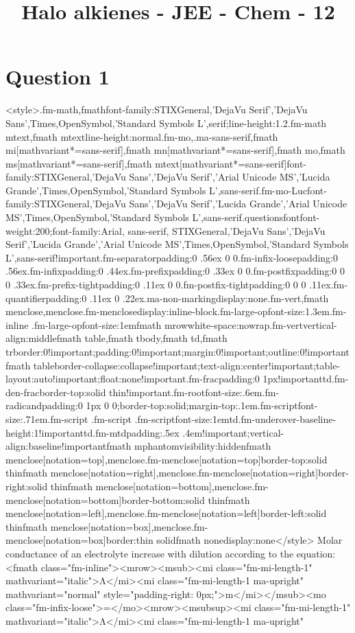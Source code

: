 \documentclass{article}
\title{Halo alkienes - JEE - Chem - 12 }
\begin{document}
                    \maketitle
                    \section*{Question 1}
<style>.fm-math,fmath{font-family:STIXGeneral,'DejaVu Serif','DejaVu Sans',Times,OpenSymbol,'Standard Symbols L',serif;line-height:1.2}.fm-math mtext,fmath mtext{line-height:normal}.fm-mo,.ma-sans-serif,fmath mi[mathvariant*=sans-serif],fmath mn[mathvariant*=sans-serif],fmath mo,fmath ms[mathvariant*=sans-serif],fmath mtext[mathvariant*=sans-serif]{font-family:STIXGeneral,'DejaVu Sans','DejaVu Serif','Arial Unicode MS','Lucida Grande',Times,OpenSymbol,'Standard Symbols L',sans-serif}.fm-mo-Luc{font-family:STIXGeneral,'DejaVu Sans','DejaVu Serif','Lucida Grande','Arial Unicode MS',Times,OpenSymbol,'Standard Symbols L',sans-serif}.questionsfont{font-weight:200;font-family:Arial, sans-serif, STIXGeneral,'DejaVu Sans','DejaVu Serif','Lucida Grande','Arial Unicode MS',Times,OpenSymbol,'Standard Symbols L',sans-serif!important}.fm-separator{padding:0 .56ex 0 0}.fm-infix-loose{padding:0 .56ex}.fm-infix{padding:0 .44ex}.fm-prefix{padding:0 .33ex 0 0}.fm-postfix{padding:0 0 0 .33ex}.fm-prefix-tight{padding:0 .11ex 0 0}.fm-postfix-tight{padding:0 0 0 .11ex}.fm-quantifier{padding:0 .11ex 0 .22ex}.ma-non-marking{display:none}.fm-vert,fmath menclose,menclose.fm-menclose{display:inline-block}.fm-large-op{font-size:1.3em}.fm-inline .fm-large-op{font-size:1em}fmath mrow{white-space:nowrap}.fm-vert{vertical-align:middle}fmath table,fmath tbody,fmath td,fmath tr{border:0!important;padding:0!important;margin:0!important;outline:0!important}fmath table{border-collapse:collapse!important;text-align:center!important;table-layout:auto!important;float:none!important}.fm-frac{padding:0 1px!important}td.fm-den-frac{border-top:solid thin!important}.fm-root{font-size:.6em}.fm-radicand{padding:0 1px 0 0;border-top:solid;margin-top:.1em}.fm-script{font-size:.71em}.fm-script .fm-script .fm-script{font-size:1em}td.fm-underover-base{line-height:1!important}td.fm-mtd{padding:.5ex .4em!important;vertical-align:baseline!important}fmath mphantom{visibility:hidden}fmath menclose[notation=top],menclose.fm-menclose[notation=top]{border-top:solid thin}fmath menclose[notation=right],menclose.fm-menclose[notation=right]{border-right:solid thin}fmath menclose[notation=bottom],menclose.fm-menclose[notation=bottom]{border-bottom:solid thin}fmath menclose[notation=left],menclose.fm-menclose[notation=left]{border-left:solid thin}fmath menclose[notation=box],menclose.fm-menclose[notation=box]{border:thin solid}fmath none{display:none}</style> Molar conductance of an electrolyte increase with dilution according to the equation:\newline<fmath class="fm-inline"><mrow><msub><mi class="fm-mi-length-1" mathvariant="italic">Λ</mi><mi class="fm-mi-length-1 ma-upright" mathvariant="normal" style="padding-right: 0px;">m</mi></msub><mo class="fm-infix-loose">=</mo><mrow><msubsup><mi class="fm-mi-length-1" mathvariant="italic">Λ</mi><mi class="fm-mi-length-1 ma-upright" 
\end{document}
